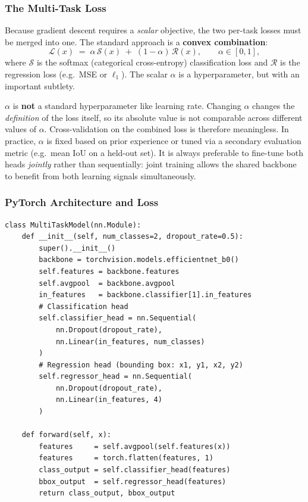 \documentclass[11pt,a4paper]{article}
\newcommand{\term}[1]{\textcolor{DefGreen}{\textbf{#1}}}
\begin{document}
\subsubsection{The Multi-Task Loss}

Because gradient descent requires a \emph{scalar} objective, the two per-task losses must be merged into one. The standard approach is a \term{convex combination}:
\[
  \mathcal{L}(x) \;=\; \alpha\,\mathcal{S}(x) \;+\; (1-\alpha)\,\mathcal{R}(x), \qquad \alpha \in [0,1],
\]
where $\mathcal{S}$ is the softmax (categorical cross-entropy) classification loss and $\mathcal{R}$ is the regression loss (e.g.\ MSE or $\ell_1$). The scalar $\alpha$ is a hyperparameter, but with an important subtlety.

\begin{warnbox}
$\alpha$ is \textbf{not} a standard hyperparameter like learning rate. Changing $\alpha$ changes the \emph{definition} of the loss itself, so its absolute value is not comparable across different values of $\alpha$. Cross-validation on the combined loss is therefore meaningless. In practice, $\alpha$ is fixed based on prior experience or tuned via a secondary evaluation metric (e.g.\ mean IoU on a held-out set). It is always preferable to fine-tune both heads \emph{jointly} rather than sequentially: joint training allows the shared backbone to benefit from both learning signals simultaneously.
\end{warnbox}

\subsubsection{PyTorch Architecture and Loss}

\begin{lstlisting}[style=pythonstyle, caption={Multi-task model with classification and regression heads}]
class MultiTaskModel(nn.Module):
    def __init__(self, num_classes=2, dropout_rate=0.5):
        super().__init__()
        backbone = torchvision.models.efficientnet_b0()
        self.features = backbone.features
        self.avgpool  = backbone.avgpool
        in_features   = backbone.classifier[1].in_features
        # Classification head
        self.classifier_head = nn.Sequential(
            nn.Dropout(dropout_rate),
            nn.Linear(in_features, num_classes)
        )
        # Regression head (bounding box: x1, y1, x2, y2)
        self.regressor_head = nn.Sequential(
            nn.Dropout(dropout_rate),
            nn.Linear(in_features, 4)
        )

    def forward(self, x):
        features     = self.avgpool(self.features(x))
        features     = torch.flatten(features, 1)
        class_output = self.classifier_head(features)
        bbox_output  = self.regressor_head(features)
        return class_output, bbox_output
\end{lstlisting}
\end{document}
